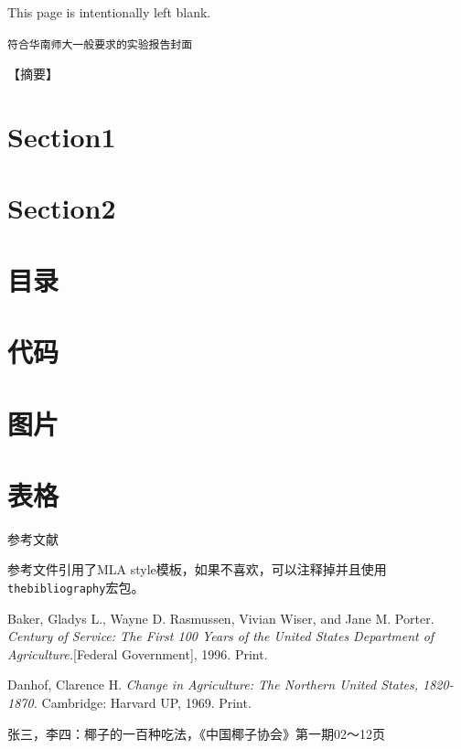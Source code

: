 \documentclass[10.5pt,a4paper,headings]{ctexart}
\newcommand*{\blankpage}{%
\vspace*{\fill}
{\centering\fontsize{32pt}{64pt} This page is intentionally left blank.\par}
\vspace{\fill}}
\newcommand{\bibent}{\noindent \hangindent 40pt}
\newenvironment{workscited}{\newpage \begin{center} 参考文献 \end{center}}{\newpage }
\begin{document}
\blankpage
\newpage
\tableofcontents

\newpage

\begin{center}
\tt 符合华南师大一般要求的实验报告封面
\end{center}
\vspace{6pt}
\setlength{\parindent}{2em}


\onehalfspacing
【摘要】

\doublespacing
\section{Section1}


\section{Section2}

\section{目录}

\section{代码}

\section{图片}

\section{表格}



\begin{workscited}

    \bibent
    参考文件引用了MLA style模板，如果不喜欢，可以注释掉并且使用\texttt{thebibliography}宏包。
    
    \bibent
    Baker, Gladys L., Wayne D. Rasmussen, Vivian Wiser, and Jane M. Porter. \textit{Century of Service: The First 100 Years of the United States Department of Agriculture.}[Federal Government], 1996. Print.
    
    \bibent
    Danhof, Clarence H. \textit{Change in Agriculture: The Northern United States, 1820-1870.} Cambridge: Harvard UP, 1969. Print.
    
    \bibent
    张三，李四：椰子的一百种吃法，《中国椰子协会》第一期02～12页
    
\end{workscited}
\end{document}
